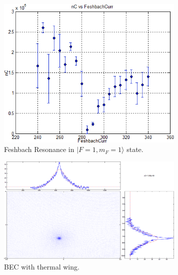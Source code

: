 \begin{figure}
  \begin{center}
    \includegraphics[width=9cm]{feshbach.png}
  \end{center}
  \caption{Feshbach Resonance in $|F=1, m_F=1\rangle$ state.}
  \label{exp:feshbach}
\end{figure}

\begin{figure}
  \begin{center}
    \includegraphics[width=9cm]{bec.png}
  \end{center}
  \caption{BEC with thermal wing.}
  \label{exp:bec-image}
\end{figure}
